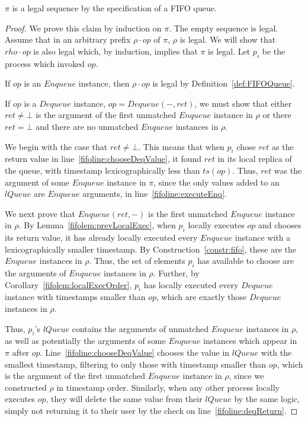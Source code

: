 \documentclass[a4paper,anonymous,USenglish]{lipics-v2021}
\theoremstyle{definition}
\begin{document}
\begin{lemma}\label{fifolem:legal}
  $\pi$ is a legal sequence by the specification of a FIFO queue.
\end{lemma}

\begin{proof}
  We prove this claim by induction on $\pi$.  The empty sequence is legal.  Assume that in an arbitrary prefix $\rho \cdot op$ of $\pi$, $\rho$ is legal.  We will show that $rho \cdot op$ is also legal which, by induction, implies that $\pi$ is legal.  Let $p_i$ be the process which invoked $op$.

  If $op$ is an $Enqueue$ instance, then $\rho \cdot op$ is legal by Definition~\ref{def:FIFOQueue}.

  If $op$ is a $Dequeue$ instance, $op = Dequeue(-,ret)$, we must show that either $ret \neq \bot$ is the argument of the first unmatched $Enqueue$ instance in $\rho$ or there $ret = \bot$ and there are no unmatched $Enqueue$ instances in $\rho$.

  We begin with the case that $ret \neq \bot$.  This means that when $p_i$ chose $ret$ as the return value in line~\ref{fifoline:chooseDeqValue}, it found $ret$ in its local replica of the queue, with timestamp lexicographically less than $ts(op)$.  Thus, $ret$ was the argument of some $Enqueue$ instance in $\pi$, since the only values added to an $lQueue$ are $Enqueue$ arguments, in line~\ref{fifoline:executeEnq}.

  We next prove that $Enqueue(ret,-)$ is the first unmatched $Enqueue$ instance in $\rho$.  By Lemma~\ref{fifolem:prevLocalExec}, when $p_i$ locally executes $op$ and chooses its return value, it has already locally executed every $Enqueue$ instance with a lexicographically smaller timestamp.  By Construction~\ref{constr:fifo}, these are the $Enqueue$ instances in $\rho$.  Thus, the set of elements $p_i$ has available to choose are the arguments of $Enqueue$ instances in $\rho$.  Further, by Corollary~\ref{fifolem:localExecOrder}, $p_i$ has locally executed every $Dequeue$ instance with timestamps smaller than $op$, which are exactly those $Dequeue$ instances in $\rho$.

  Thus, $p_i$'s $lQueue$ contains the arguments of unmatched $Enqueue$ instances in $\rho$, as well as potentially the arguments of some $Enqueue$ instances which appear in $\pi$ after $op$.  Line~\ref{fifoline:chooseDeqValue} chooses the value in $lQueue$ with the smallest timestamp, filtering to only those with timestamp smaller than $op$, which is the argument of the first unmatched $Enqueue$ instance in $\rho$, since we constructed $\rho$ in timestamp order.  Similarly, when any other process locally executes $op$, they will delete the same value from their $lQueue$ by the same logic, simply not returning it to their user by the check on line~\ref{fifoline:deqReturn}.  


\end{proof}
\end{document}
